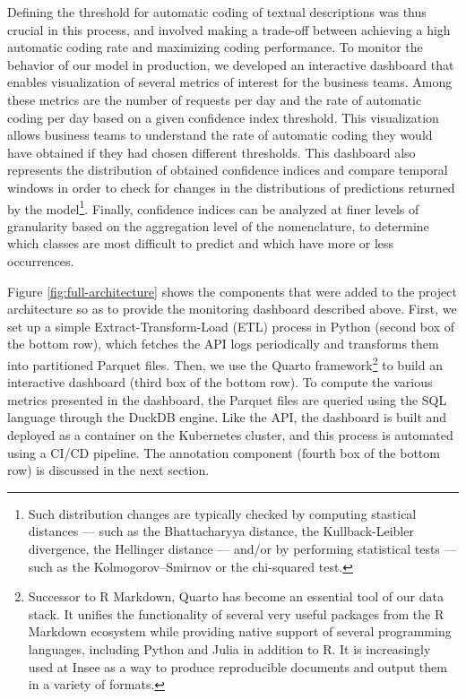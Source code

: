 Defining the threshold for automatic coding of textual descriptions was thus crucial in this process, and involved making a trade-off between achieving a high automatic coding rate and maximizing coding performance. To monitor the behavior of our model in production, we developed an interactive dashboard that enables visualization of several metrics of interest for the business teams. Among these metrics are the number of requests per day and the rate of automatic coding per day based on a given confidence index threshold. This visualization allows business teams to understand the rate of automatic coding they would have obtained if they had chosen different thresholds. This dashboard also represents the distribution of obtained confidence indices and compare temporal windows in order to check for changes in the distributions of predictions returned by the model\footnote{Such distribution changes are typically checked by computing stastical distances — such as the Bhattacharyya distance, the Kullback-Leibler divergence, the Hellinger distance — and/or by performing statistical tests — such as the Kolmogorov–Smirnov or the chi-squared test.}. Finally, confidence indices can be analyzed at finer levels of granularity based on the aggregation level of the nomenclature, to determine which classes are most difficult to predict and which have more or less occurrences.

Figure \ref{fig:full-architecture} shows the components that were added to the project architecture so as to provide the monitoring dashboard described above. First, we set up a simple Extract-Transform-Load (ETL) process in Python (second box of the bottom row), which fetches the API logs periodically and transforms them into partitioned Parquet files. Then, we use the Quarto framework\footnote{Successor to R Markdown, Quarto has become an essential tool of our data stack. It unifies the functionality of several very useful packages from the R Markdown ecosystem while providing native support of several programming languages, including Python and Julia in addition to R. It is increasingly used at Insee as a way to produce reproducible documents and output them in a variety of formats.} to build an interactive dashboard (third box of the bottom row). To compute the various metrics presented in the dashboard, the Parquet files are queried using the SQL language through the DuckDB engine. Like the API, the dashboard is built and deployed as a container on the Kubernetes cluster, and this process is automated using a CI/CD pipeline. The annotation component (fourth box of the bottom row) is discussed in the next section.

